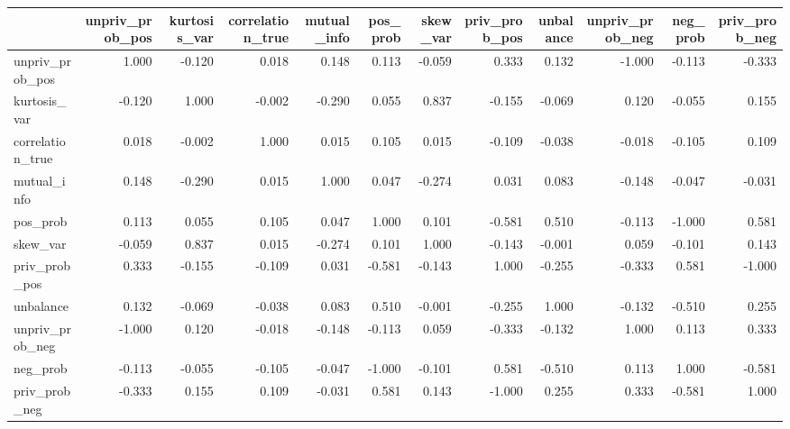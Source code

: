 \begin{tabular}{lrrrrrrrrrrr}
\toprule
 & unpriv_prob_pos & kurtosis_var & correlation_true & mutual_info & pos_prob & skew_var & priv_prob_pos & unbalance & unpriv_prob_neg & neg_prob & priv_prob_neg \\
\midrule
unpriv_prob_pos & 1.000 & -0.120 & 0.018 & 0.148 & 0.113 & -0.059 & 0.333 & 0.132 & -1.000 & -0.113 & -0.333 \\
kurtosis_var & -0.120 & 1.000 & -0.002 & -0.290 & 0.055 & 0.837 & -0.155 & -0.069 & 0.120 & -0.055 & 0.155 \\
correlation_true & 0.018 & -0.002 & 1.000 & 0.015 & 0.105 & 0.015 & -0.109 & -0.038 & -0.018 & -0.105 & 0.109 \\
mutual_info & 0.148 & -0.290 & 0.015 & 1.000 & 0.047 & -0.274 & 0.031 & 0.083 & -0.148 & -0.047 & -0.031 \\
pos_prob & 0.113 & 0.055 & 0.105 & 0.047 & 1.000 & 0.101 & -0.581 & 0.510 & -0.113 & -1.000 & 0.581 \\
skew_var & -0.059 & 0.837 & 0.015 & -0.274 & 0.101 & 1.000 & -0.143 & -0.001 & 0.059 & -0.101 & 0.143 \\
priv_prob_pos & 0.333 & -0.155 & -0.109 & 0.031 & -0.581 & -0.143 & 1.000 & -0.255 & -0.333 & 0.581 & -1.000 \\
unbalance & 0.132 & -0.069 & -0.038 & 0.083 & 0.510 & -0.001 & -0.255 & 1.000 & -0.132 & -0.510 & 0.255 \\
unpriv_prob_neg & -1.000 & 0.120 & -0.018 & -0.148 & -0.113 & 0.059 & -0.333 & -0.132 & 1.000 & 0.113 & 0.333 \\
neg_prob & -0.113 & -0.055 & -0.105 & -0.047 & -1.000 & -0.101 & 0.581 & -0.510 & 0.113 & 1.000 & -0.581 \\
priv_prob_neg & -0.333 & 0.155 & 0.109 & -0.031 & 0.581 & 0.143 & -1.000 & 0.255 & 0.333 & -0.581 & 1.000 \\
\bottomrule
\end{tabular}

